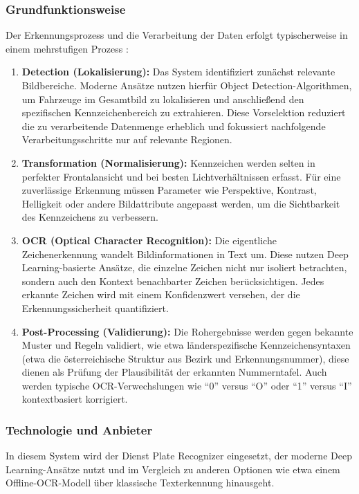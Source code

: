 \subsubsection{Grundfunktionsweise}
Der Erkennungsprozess und die Verarbeitung der Daten erfolgt typischerweise in einem mehrstufigen Prozess \cite{senstar_alpr}:

\begin{enumerate}
    \item \textbf{Detection (Lokalisierung):}
          Das System identifiziert zunächst relevante Bildbereiche.
          Moderne Ansätze nutzen hierfür Object Detection-Algorithmen, um Fahrzeuge im Gesamtbild zu lokalisieren und anschließend den spezifischen Kennzeichenbereich zu extrahieren.
          Diese Vorselektion reduziert die zu verarbeitende Datenmenge erheblich und fokussiert nachfolgende Verarbeitungsschritte nur auf relevante Regionen.

    \item \textbf{Transformation (Normalisierung):}
          Kennzeichen werden selten in perfekter Frontalansicht und bei besten Lichtverhältnissen erfasst.
          Für eine zuverlässige Erkennung müssen Parameter wie Perspektive, Kontrast, Helligkeit oder andere Bildattribute angepasst werden, um die Sichtbarkeit des Kennzeichens zu verbessern.

    \item \textbf{OCR (Optical Character Recognition):}
          Die eigentliche Zeichenerkennung wandelt Bildinformationen in Text um.
          Diese nutzen Deep Learning-basierte Ansätze, die einzelne Zeichen nicht nur isoliert betrachten, sondern auch den Kontext benachbarter Zeichen berücksichtigen.
          Jedes erkannte Zeichen wird mit einem Konfidenzwert versehen, der die Erkennungssicherheit quantifiziert.

    \item \textbf{Post-Processing (Validierung):}
          Die Rohergebnisse werden gegen bekannte Muster und Regeln validiert, wie etwa länderspezifische Kennzeichensyntaxen (etwa die österreichische Struktur aus Bezirk und Erkennungsnummer), diese dienen als Prüfung der Plausibilität der erkannten Nummerntafel.
          Auch werden typische OCR-Verwechslungen wie "`0"' versus "`O"' oder "`1"' versus "`I"' kontextbasiert korrigiert.
\end{enumerate}

\newpage
\subsubsection{Technologie und Anbieter}
In diesem System wird der Dienst Plate Recognizer eingesetzt, der moderne Deep Learning-Ansätze nutzt und im Vergleich zu anderen Optionen wie etwa einem Offline-OCR-Modell über klassische Texterkennung hinausgeht.

